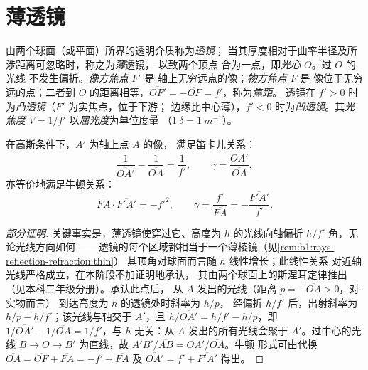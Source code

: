 \section{薄透镜}

\begin{definition}[薄透镜]\label{def:b1:mirrors-thin-lenses:lens}
由两个球面（或平面）所界的透明介质称为\emph{透镜}；
当其厚度相对于曲率半径及所涉距离可忽略时，称之为\emph{薄}透镜，
以致两个顶点
合为一点，即\emph{光心} $O$。过 $O$ 的光线
不发生偏折。\emph{像方焦点} $F'$ 是
轴上无穷远点的像；\emph{物方焦点} $F$ 是
像位于无穷远的点；二者到
$O$ 的距离相等，$\overline{OF'} = -\overline{OF} = f'$，称为\emph{焦距}。
透镜在 $f' > 0$ 时为\emph{凸透镜}（$F'$ 为实焦点，位于下游；
边缘比中心薄），$f' < 0$ 时为\emph{凹透镜}。其\emph{光焦度}
$V = 1/f'$ 以\emph{屈光度}为单位度量
（$\qty{1}{\delta} = \qty{1}{m^{-1}}$）。
\end{definition}

\begin{theorem}[薄透镜的共轭关系]\label{thm:b1:mirrors-thin-lenses:lensconj}
在高斯条件下，$A'$ 为轴上点 $A$ 的像，
满足笛卡儿关系：
\[
\frac{1}{\overline{OA'}} - \frac{1}{\overline{OA}} = \frac{1}{f'},
\qquad
\gamma = \frac{\overline{OA'}}{\overline{OA}},
\]
亦等价地满足牛顿关系：
\[
\overline{FA}\cdot\overline{F'A'} = -f'^2,
\qquad
\gamma = \frac{f'}{\overline{FA}} = -\frac{\overline{F'A'}}{f'} .
\]
\end{theorem}

\begin{proof}[部分证明]
关键事实是，薄透镜使穿过它、高度为
$h$ 的光线向轴偏折 $h/f'$ 角，无论光线方向如何
——透镜的每个区域都相当于一个薄棱镜（见\cref{rem:b1:rays-reflection-refraction:thin}）
其顶角对球面而言随 $h$ 线性增长；此线性关系
对近轴光线严格成立，在本阶段不加证明地承认，
其由两个球面上的斯涅耳定律推出（见本科二年级分册）。承认此点后，
从 $A$ 发出的光线（距离 $p = -\overline{OA} > 0$，对实物而言）
到达高度为 $h$ 的透镜处时斜率为 $h/p$，
经偏折 $h/f'$ 后，出射斜率为 $h/p - h/f'$；该光线与轴交于
$A'$，且 $h/\overline{OA'} = h/f' - h/p$，即 $1/\overline{OA'}
- 1/\overline{OA} = 1/f'$，与 $h$ 无关：从 $A$ 发出的所有光线会聚于
$A'$。过中心的光线 $B \to O \to B'$ 为直线，故
$\overline{A'B'}/\overline{AB} = \overline{OA'}/\overline{OA}$。牛顿
形式可由代换 $\overline{OA} = \overline{OF} + \overline{FA}
= -f' + \overline{FA}$ 及 $\overline{OA'} = f' + \overline{F'A'}$ 得出。
\end{proof}

